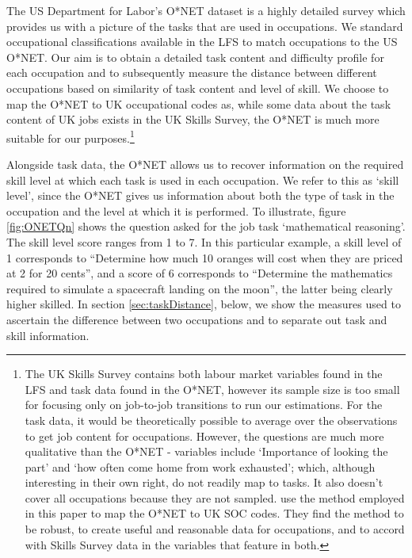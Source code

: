 \documentclass[11pt, oneside]{article}
\begin{document}
	The US Department for Labor's O*NET dataset is a highly detailed survey which provides us with a picture of the tasks that are used in occupations. We standard occupational classifications available in the LFS to match occupations to the US O*NET. Our aim is to obtain a detailed task content and difficulty profile for each occupation and to subsequently measure the distance between different occupations based on similarity of task content and level of skill. We choose to map the O*NET to UK occupational codes as, while some data about the task content of UK jobs exists in the UK Skills Survey, the O*NET is much more suitable for our purposes.\footnote{The UK Skills Survey contains both labour market variables found in the LFS and task data found in the O*NET, however its sample size is too small for focusing only on job-to-job transitions to run our estimations. For the task data, it would be theoretically possible to average over the observations to get job content for occupations. However, the questions are much more qualitative than the O*NET - variables include `Importance of looking the part' and `how often come home from work exhausted'; which, although interesting in their own right, do not readily map to tasks. It also doesn't cover all occupations because they are not sampled. \cite{ONETreport} use the method employed in this paper to map the O*NET to UK SOC codes. They find the method to be robust, to create useful and reasonable data for occupations, and to accord with Skills Survey data in the variables that feature in both.} 
	
	Alongside task data, the O*NET allows us to recover information on the required skill level at which each task is used in each occupation. We refer to this as `skill level', since the O*NET gives us information about both the type of task in the occupation and the level at which it is performed. To illustrate, figure \ref{fig:ONETQn} shows the question asked for the job task `mathematical reasoning'. The skill level score ranges from 1 to 7. In this particular example, a skill level of 1 corresponds to ``Determine how much 10 oranges will cost when they are priced at 2 for 20 cents'', and a score of 6 corresponds to ``Determine the mathematics required to simulate a spacecraft landing on the moon'', the latter being clearly higher skilled. In section \ref{sec:taskDistance}, below, we show the measures used to ascertain the difference between two occupations and to separate out task and skill information. 
	
	\vspace{2mm}
	
\end{document}
